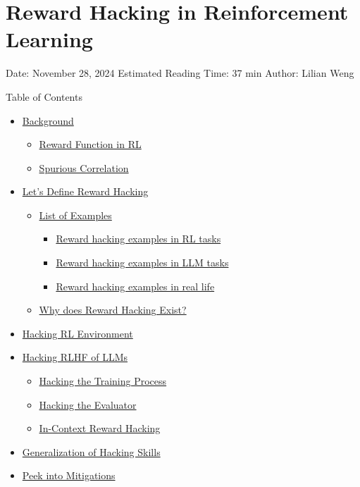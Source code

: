 \section{Reward Hacking in Reinforcement Learning}\label{reward-hacking-in-reinforcement-learning}

Date: November 28, 2024 \textbar{} Estimated Reading Time: 37 min \textbar{} Author: Lilian Weng

{Table of Contents}

\begin{itemize}
\tightlist
\item
  \hyperref[background]{Background}

  \begin{itemize}
  \tightlist
  \item
    \hyperref[reward-function-in-rl]{Reward Function in RL}
  \item
    \hyperref[spurious-correlation]{Spurious Correlation}
  \end{itemize}
\item
  \hyperref[lets-define-reward-hacking]{Let's Define Reward Hacking}

  \begin{itemize}
  \tightlist
  \item
    \hyperref[list-of-examples]{List of Examples}

    \begin{itemize}
    \tightlist
    \item
      \hyperref[reward-hacking-examples-in-rl-tasks]{Reward hacking examples in RL tasks}
    \item
      \hyperref[reward-hacking-examples-in-llm-tasks]{Reward hacking examples in LLM tasks}
    \item
      \hyperref[reward-hacking-examples-in-real-life]{Reward hacking examples in real life}
    \end{itemize}
  \item
    \hyperref[why-does-reward-hacking-exist]{Why does Reward Hacking Exist?}
  \end{itemize}
\item
  \hyperref[hacking-rl-environment]{Hacking RL Environment}
\item
  \hyperref[hacking-rlhf-of-llms]{Hacking RLHF of LLMs}

  \begin{itemize}
  \tightlist
  \item
    \hyperref[hacking-the-training-process]{Hacking the Training Process}
  \item
    \hyperref[hacking-the-evaluator]{Hacking the Evaluator}
  \item
    \hyperref[in-context-reward-hacking]{In-Context Reward Hacking}
  \end{itemize}
\item
  \hyperref[generalization-of-hacking-skills]{Generalization of Hacking Skills}
\item
  \hyperref[peek-into-mitigations]{Peek into Mitigations}


\end{itemize}
